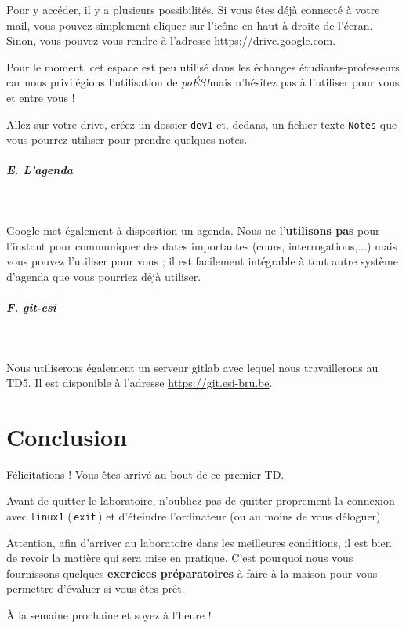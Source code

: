 \documentclass[a4paper,11pt]{article}
\begin{document}
 \par 
 Pour y acc\'eder, il y a plusieurs possibilit\'es. Si vous \^etes d\'ej\`a connect\'e \`a votre mail, vous pouvez simplement cliquer sur l'ic\^one en haut \`a droite de l'\'ecran. Sinon, vous pouvez vous rendre \`a l'adresse \url{https://drive.google.com}.
			
 \par
Pour le moment, cet espace est peu utilis\'e dans les \'echanges \'etudiants-professeurs car nous privil\'egions l'utilisation de \textit{po\'ESI}mais n'h\'esitez pas \`a l'utiliser pour vous et entre vous !
			
\par
\begin{Exercice}{}
Allez sur votre drive, cr\'eez un dossier \verb_dev1_ et, dedans, un fichier texte \verb_Notes_ que vous pourrez utiliser pour prendre quelques notes.
\end{Exercice}

 \par
        
\subparagraph{E. L'agenda} 

\textcolor{white}{.} \par
Google met \'egalement \`a disposition un agenda. Nous ne l'\textbf{utilisons pas} pour l'instant pour communiquer des dates importantes (cours, interrogations,...) mais vous pouvez l'utiliser pour vous ; il est facilement int\'egrable \`a tout autre syst\`eme d'agenda que vous pourriez d\'ej\`a utiliser.
			
\par
\subparagraph{F. git-esi}
\textcolor{white}{.} \par
Nous utiliserons également un serveur gitlab avec lequel nous travaillerons au TD5. Il est disponible à l'adresse \url{https://git.esi-bru.be}.

\par
\section{Conclusion}

Félicitations ! Vous \^etes arriv\'e au bout de ce premier TD.
 \par
Avant de quitter le laboratoire, n'oubliez pas de quitter proprement la connexion avec \verb_linux1_ (\,\verb|exit|\,) et d'\'eteindre l'ordinateur (ou au moins de vous d\'eloguer).
\par
Attention, afin d'arriver au laboratoire dans les meilleures conditions, il est bien de revoir la mati\`ere qui sera mise en pratique.  C'est pourquoi nous vous fournissons quelques \textbf{exercices pr\'eparatoires} \`a faire \`a la maison pour vous permettre d'\'evaluer si vous \^etes pr\^et.  
 \par
\`A la semaine prochaine et soyez \`a l'heure !
\par
	
	
\end{document}
